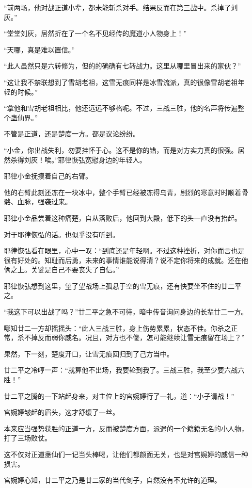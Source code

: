 \begin{this_body}
“前两场，他对战正道小辈，都未能斩杀对手。结果反而在第三战中。杀掉了刘灰。”

“堂堂刘灰，居然折在了一个名不见经传的魔道小人物身上！”

“天哪，真是难以置信。”

“此人虽然只是六转修为，但的的确确有七转战力。这里从哪里冒出来的家伙？”

“这让我不禁联想到了雪胡老祖，这雪无痕同样是冰雪流派，真的很像雪胡老祖年轻的时候。”

“拿他和雪胡老祖相比，他还远远不够格呢。不过，三战三胜，他的名声将传遍整个蛊仙界。”

不管是正道，还是楚度一方。都是议论纷纷。

“小金，你出战失利，勿要挂怀于心。这不是你的错，而是对方实力真的很强。居然杀得刘灰！唉。”耶律恢弘宽慰身边的年轻人。

耶律小金抚摸着自己的右臂。

他的右臂此刻还冻在一块冰中，整个手臂已经被冻得乌青，剧烈的寒意时时顺着骨骼、血脉，强袭过来。

耶律小金品尝着这种痛楚，自从落败后，他回到大殿，低下的头一直没有抬起。

对于耶律恢弘的话。也似乎没有听到。

耶律恢弘看在眼里，心中一叹：“到底还是年轻啊。不过这种挫折，对你而言也是很有好处的。知耻而后勇，未来的事情谁能说得清？说不定你将来的成就。还在他俩之上。关键是自己不要丧失了自信。”

耶律恢弘想到这里，望了望战场上孤悬于空的雪无痕，还有快要坐不住的廿二平之。

“我这下可以出战了吗？”廿二平之急不可待，暗中传音询问身边的长辈廿二一方。

哪知廿二一方却摇摇头：“此人三战三胜，身上伤势累累，状态不佳。你杀之正常，杀不掉反而弱你威名。况且，对方也不傻，怎可能继续让雪无痕留在场上？”

果然，下一刻，楚度开口，让雪无痕回归到了己方当中。

廿二平之冷哼一声：“就算他不出场，我要轮到我了。三战三胜，我至少要六战六胜！”

廿二平之腾的一下站起身来，对主位上的宫婉婷行了一礼，道：“小子请战！”

宫婉婷皱起的眉头，这才舒缓了一丝。

本来应当强势获胜的正道一方，反而被楚度方面，派遣的一个籍籍无名的小人物，打了三场败仗。

这不仅对正道蛊仙们一记当头棒喝，让他们都颜面无关，也是对宫婉婷的威信一种损害。

宫婉婷心知，廿二平之乃是廿二家的当代剑子，自然没有不允许的道理。


\end{this_body}
